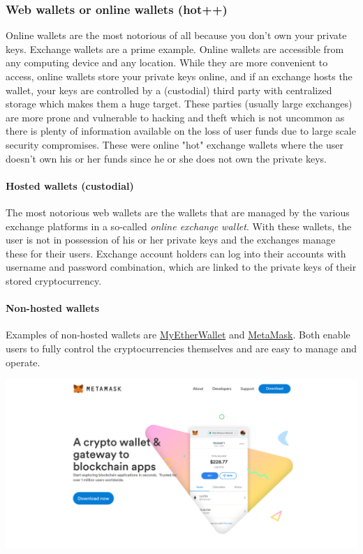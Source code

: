 \subsubsection{Web wallets or online wallets (hot++)}
Online wallets are the most notorious of all because you don't own your private keys. Exchange wallets are a prime example. Online wallets are accessible from any computing device and any location. While they are more convenient to access, online wallets store your private keys online, and if an exchange hosts the wallet, your keys are controlled by a (custodial) third party with centralized storage which makes them a huge target. These parties (usually large exchanges) are more prone and vulnerable to hacking and theft which is not uncommon as there is plenty of information available on the loss of user funds due to large scale security compromises. These were online "hot" exchange wallets where the user doesn't own his or her funds since he or she does not own the private keys.


\paragraph{Hosted wallets (custodial)}
The most notorious web wallets are the wallets that are managed by the various exchange platforms in a so-called \emph{online exchange wallet}. With these wallets, the user is not in possession of his or her private keys and the exchanges manage these for their users. Exchange account holders can log into their accounts with username and password combination, which are linked to the private keys of their stored cryptocurrency.

\paragraph{Non-hosted wallets}
Examples of non-hosted wallets are \href{https://www.myetherwallet.com}{MyEtherWallet} and \href{https://www.metamask.io}{MetaMask}.  Both enable users to fully control the cryptocurrencies themselves and are easy to manage and operate.

\bigskip
\begin{borderbox}
    \includegraphics[width=\textwidth]{img/ch-wallets/metamask.png}
\end{borderbox}




